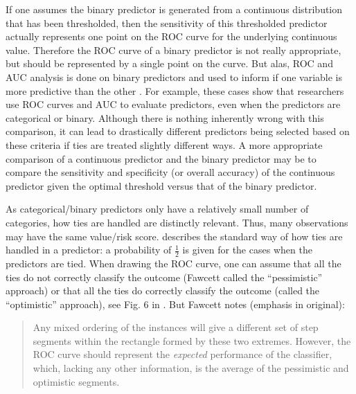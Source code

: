 \documentclass[article]{jss}
\begin{document}
If one assumes the binary predictor is generated from a continuous
distribution that has been thresholded, then the sensitivity of this
thresholded predictor actually represents one point on the ROC curve for
the underlying continuous value. Therefore the ROC curve of a binary
predictor is not really appropriate, but should be represented by a
single point on the curve. But alas, ROC and AUC analysis is done on
binary predictors and used to inform if one variable is more predictive
than the other
\citetext{\citealp{jama}; \citealp{jama2}; \citealp{glaveckaite2011value}; \citealp{blumberg2016technology}; \citealp{budwega2016factors}; \citealp{mwipatayi2016durability}; \citealp[\citet{shterev2018bayesian}]{xiong2018comparison}; \citealp{kushnir2018degree}; \citealp{snarr2017parasternal}; \citealp{veltri2018deep}}.
For example, these cases show that researchers use ROC curves and AUC to
evaluate predictors, even when the predictors are categorical or binary.
Although there is nothing inherently wrong with this comparison, it can
lead to drastically different predictors being selected based on these
criteria if ties are treated slightly different ways. A more appropriate
comparison of a continuous predictor and the binary predictor may be to
compare the sensitivity and specificity (or overall accuracy) of the
continuous predictor given the optimal threshold versus that of the
binary predictor.

As categorical/binary predictors only have a relatively small number of
categories, how ties are handled are distinctly relevant. Thus, many
observations may have the same value/risk score.
\citet{fawcett2006introduction} describes the standard way of how ties
are handled in a predictor: a probability of \(\frac{1}{2}\) is given
for the cases when the predictors are tied. When drawing the ROC curve,
one can assume that all the ties do not correctly classify the outcome
(Fawcett called the ``pessimistic'' approach) or that all the ties do
correctly classify the outcome (called the ``optimistic'' approach), see
Fig. 6 in \citep{fawcett2006introduction}. But Fawcett notes (emphasis
in original):

\begin{quote}
Any mixed ordering of the instances will give a different set of step
segments within the rectangle formed by these two extremes. However, the
ROC curve should represent the \emph{expected} performance of the
classifier, which, lacking any other information, is the average of the
pessimistic and optimistic segments.
\end{quote}
\end{document}
